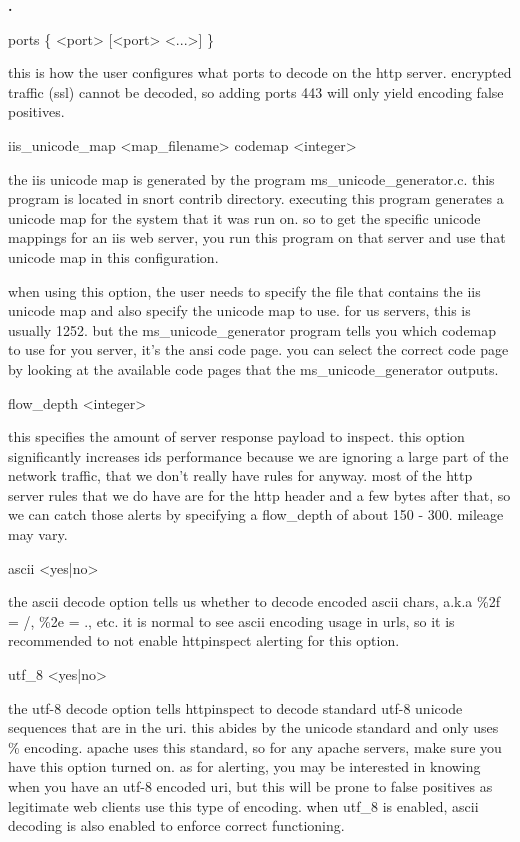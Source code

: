 \documentclass[english]{report}
\newcounter{slistnum}
\newenvironment{slist}{
    \begin{list}{
        {
            \bf \arabic{slistnum}.
        } 
    }{
        \usecounter{slistnum} 
    }
}{
    \end{list} 
}
\begin{document}
\begin{slist}
\item ports \{ <port> [<port> <...>] \}

this is how the user configures what ports to decode on the http server.
encrypted traffic (ssl) cannot be decoded, so adding ports 443 will only
yield encoding false positives.

\item iis\_unicode\_map <map\_filename> codemap <integer>

the iis unicode map is generated by the program ms\_unicode\_generator.c.  this
program is located in snort contrib directory.  executing this program
generates a unicode map for the system that it was run on.  so to get the
specific unicode mappings for an iis web server, you run this program on that
server and use that unicode map in this configuration.

when using this option, the user needs to specify the file that contains the
iis unicode map and also specify the unicode map to use.  for us servers, this
is usually 1252.  but the ms\_unicode\_generator program tells you which codemap
to use for you server, it's the ansi code page.  you can select the correct code
page by looking at the available code pages that the ms\_unicode\_generator
outputs.

\item flow\_depth <integer>

this specifies the amount of server response payload to inspect.  this option
significantly increases ids performance because we are ignoring a large part of
the network traffic, that we don't really have rules for anyway.  most of the
http server rules that we do have are for the http header and a few bytes after
that, so we can catch those alerts by specifying a flow\_depth of about 150 -
300.  mileage may vary.

\item ascii <yes|no>

the ascii decode option tells us whether to decode encoded ascii chars, a.k.a
\%2f = /, \%2e = ., etc.  it is normal to see ascii encoding usage in urls, so it
is recommended to not enable httpinspect alerting for this option.

\item utf\_8 <yes|no>

the utf-8 decode option tells httpinspect to decode standard utf-8 unicode
sequences that are in the uri.  this abides by the unicode standard and only
uses \% encoding.  apache uses this standard, so for any apache servers, make
sure you have this option turned on.  as for alerting, you may be interested in
knowing when you have an utf-8 encoded uri, but this will be prone to false
positives as legitimate web clients use this type of encoding.  when utf\_8 is
enabled, ascii decoding is also enabled to enforce correct functioning.  


\end{slist}
\end{document}
